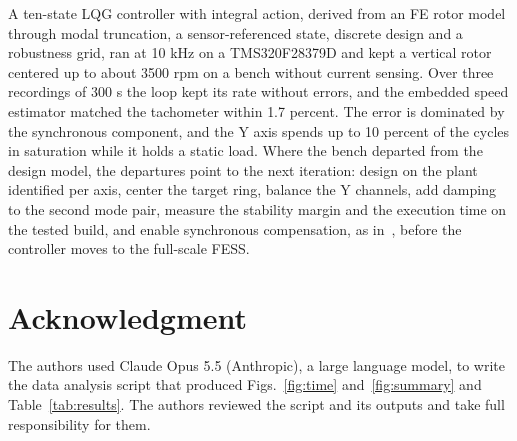 \documentclass[conference]{IEEEtran}
\begin{document}
A ten-state LQG controller with integral action, derived from an FE rotor model through modal truncation, a sensor-referenced state, discrete design and a robustness grid, ran at 10 kHz on a TMS320F28379D and kept a vertical rotor centered up to about 3500 rpm on a bench without current sensing. Over three recordings of 300 s the loop kept its rate without errors, and the embedded speed estimator matched the tachometer within 1.7 percent. The error is dominated by the synchronous component, and the Y axis spends up to 10 percent of the cycles in saturation while it holds a static load. Where the bench departed from the design model, the departures point to the next iteration: design on the plant identified per axis, center the target ring, balance the Y channels, add damping to the second mode pair, measure the stability margin and the execution time on the tested build, and enable synchronous compensation, as in~\cite{zhao2026constraint}, before the controller moves to the full-scale FESS.

\section*{Acknowledgment}

The authors used Claude Opus 5.5 (Anthropic), a large language model, to write the data analysis script that produced Figs.~\ref{fig:time} and~\ref{fig:summary} and Table~\ref{tab:results}. The authors reviewed the script and its outputs and take full responsibility for them.



\end{document}
